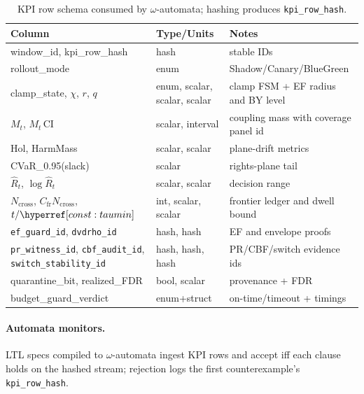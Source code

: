 \begin{table}[t]
\centering
\renewcommand{\arraystretch}{1.06}
\begin{tabularx}{\textwidth}{@{}>{\raggedright\arraybackslash}p{3.7cm} >{\raggedright\arraybackslash}p{3.1cm} >{\raggedright\arraybackslash}X@{}}
\toprule
\textbf{Column} & \textbf{Type/Units} & \textbf{Notes} \\
\midrule
window\_id, kpi\_row\_hash & hash & stable IDs \\
rollout\_mode & enum & Shadow/Canary/BlueGreen \\
clamp\_state, $\chi$, $r$, $q$ & enum, scalar, scalar, scalar & clamp FSM + EF radius and BY level \\
$M_t$, $M_t$\,CI & scalar, interval & coupling mass with coverage panel id \\
Hol, HarmMass & scalar, scalar & plane-drift metrics \\
CVaR\_0.95(slack) & scalar & rights-plane tail \\
$\hat R_t$, $\log\hat R_t$ & scalar, scalar & decision range \\
$N_{\mathrm{cross}}$, $C_{\mathrm{fr}}N_{\mathrm{cross}}$, $t/\constref{taumin}$ & int, scalar, scalar & frontier ledger and dwell bound \\
\texttt{ef\_guard\_id}, \texttt{dvdrho\_id} & hash, hash & EF and envelope proofs \\
\texttt{pr\_witness\_id}, \texttt{cbf\_audit\_id}, \texttt{switch\_stability\_id} & hash, hash, hash & PR/CBF/switch evidence ids \\
quarantine\_bit, realized\_FDR & bool, scalar & provenance + FDR \\
budget\_guard\_verdict & enum+struct & on-time/timeout + timings \\
\bottomrule
\end{tabularx}
\caption{KPI row schema consumed by $\omega$-automata; hashing produces \texttt{kpi\_row\_hash}.}
\label{tab:kpi-schema}
\end{table}

\paragraph{Automata monitors.}
LTL specs compiled to $\omega$-automata ingest KPI rows and accept iff each clause holds on the hashed stream; rejection logs the first counterexample’s \texttt{kpi\_row\_hash}. 

